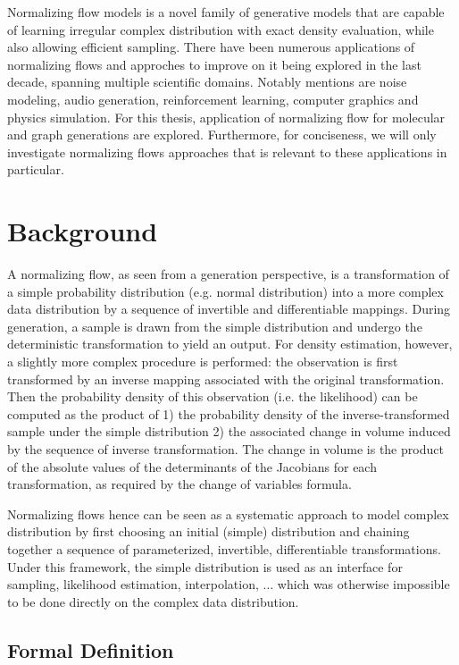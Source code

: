Normalizing flow models is a novel family of generative models that are capable
of learning irregular complex distribution with exact density evaluation, while
also allowing efficient sampling. There have been numerous applications of
normalizing flows and approches to improve on it being explored in the last
decade, spanning multiple scientific domains. Notably mentions are noise
modeling, audio generation, reinforcement learning, computer graphics and
physics simulation. For this thesis, application of normalizing flow for
molecular and graph generations are explored. Furthermore, for
conciseness, we will only investigate normalizing flows approaches that is
relevant to these applications in particular.

\section{Background}

A normalizing flow, as seen from a generation perspective, is a transformation
of a simple probability distribution (e.g. normal distribution) into a more
complex data distribution by a sequence of invertible and differentiable
mappings. During generation, a sample is drawn from the simple distribution and
undergo the deterministic transformation to yield an output. For density
estimation, however, a slightly more complex procedure is performed: the
observation is first transformed by an inverse mapping associated with the
original transformation. Then the probability density of this observation (i.e.
the likelihood) can be computed as the product of 1) the probability density of
the inverse-transformed sample under the simple distribution 2) the associated change in volume induced by the sequence of inverse transformation. The change in volume is the product of the absolute values of the determinants of the Jacobians for each transformation, as required by the change of variables formula.

Normalizing flows hence can be seen as a systematic approach to model complex
distribution by first choosing an initial (simple) distribution and chaining
together a sequence of parameterized, invertible, differentiable
transformations. Under this framework, the simple distribution is used as an
interface for sampling, likelihood estimation, interpolation, $\ldots$ which was
otherwise impossible to be done directly on the complex data distribution.

\subsection{Formal Definition}


